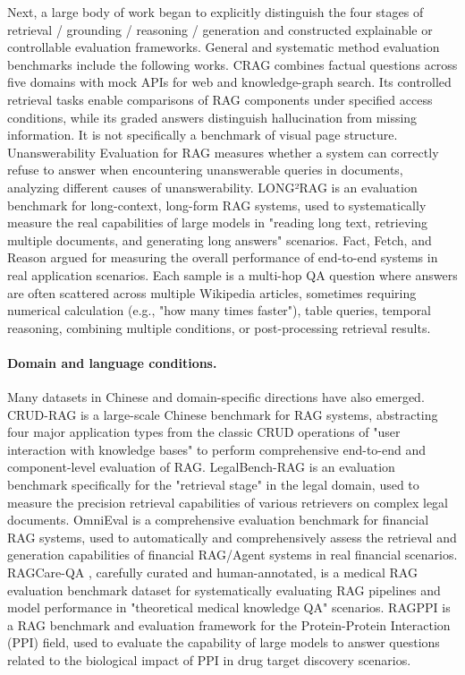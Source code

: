 Next, a large body of work began to explicitly distinguish the four stages of retrieval / grounding / reasoning / generation and constructed explainable or controllable evaluation frameworks. General and systematic method evaluation benchmarks include the following works. CRAG \cite{crag2024} combines factual questions across five domains with mock APIs for web and knowledge-graph search. Its controlled retrieval tasks enable comparisons of RAG components under specified access conditions, while its graded answers distinguish hallucination from missing information. It is not specifically a benchmark of visual page structure. Unanswerability Evaluation for RAG \cite{unanswerablerag2024} measures whether a system can correctly refuse to answer when encountering unanswerable queries in documents, analyzing different causes of unanswerability. LONG²RAG \cite{long2rag2024} is an evaluation benchmark for long-context, long-form RAG systems, used to systematically measure the real capabilities of large models in "reading long text, retrieving multiple documents, and generating long answers" scenarios. Fact, Fetch, and Reason \cite{factfetchreason2024} argued for measuring the overall performance of end-to-end systems in real application scenarios. Each sample is a multi-hop QA question where answers are often scattered across multiple Wikipedia articles, sometimes requiring numerical calculation (e.g., "how many times faster"), table queries, temporal reasoning, combining multiple conditions, or post-processing retrieval results.

\paragraph{Domain and language conditions.}
Many datasets in Chinese and domain-specific directions have also emerged. CRUD-RAG \cite{crudrag2024} is a large-scale Chinese benchmark for RAG systems, abstracting four major application types from the classic CRUD operations of "user interaction with knowledge bases" to perform comprehensive end-to-end and component-level evaluation of RAG. LegalBench-RAG \cite{legalbenchragr2024} is an evaluation benchmark specifically for the "retrieval stage" in the legal domain, used to measure the precision retrieval capabilities of various retrievers on complex legal documents. OmniEval \cite{omnieval2024} is a comprehensive evaluation benchmark for financial RAG systems, used to automatically and comprehensively assess the retrieval and generation capabilities of financial RAG/Agent systems in real financial scenarios. RAGCare-QA \cite{ragcareqa2025}, carefully curated and human-annotated, is a medical RAG evaluation benchmark dataset for systematically evaluating RAG pipelines and model performance in "theoretical medical knowledge QA" scenarios. RAGPPI \cite{ragppi2024} is a RAG benchmark and evaluation framework for the Protein-Protein Interaction (PPI) field, used to evaluate the capability of large models to answer questions related to the biological impact of PPI in drug target discovery scenarios.

